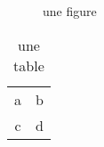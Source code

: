 \documentclass{article}
\begin{document}
\renewcommand{\figurename}{Figure}
\renewcommand{\tablename}{Tableau}
\lipsum
\begin{figure}
\caption{une figure}
\end{figure}
\begin{table}
\begin{tabular}{cc}
a & b \\
c & d
\end{tabular}
\caption{une table}
\end{table}
\end{document}
